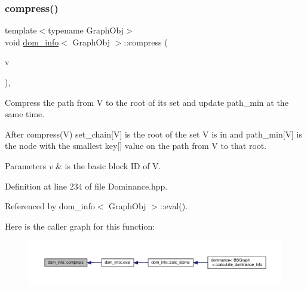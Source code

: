 \subsubsection{\texorpdfstring{compress()}{compress()}}
{\footnotesize\ttfamily template$<$typename Graph\+Obj$>$ \\
void \hyperlink{classdom__info}{dom\+\_\+info}$<$ Graph\+Obj $>$\+::compress (\begin{DoxyParamCaption}\item[{\hyperlink{Dominance_8hpp_ac35ffd4ddeccae8225d6ec6f55d65a97}{T\+BB}}]{v }\end{DoxyParamCaption})\hspace{0.3cm}{\ttfamily [inline]}, {\ttfamily [private]}}



Compress the path from V to the root of its set and update path\+\_\+min at the same time. 

After compress(\+V) set\+\_\+chain\mbox{[}V\mbox{]} is the root of the set V is in and path\+\_\+min\mbox{[}V\mbox{]} is the node with the smallest key\mbox{[}\mbox{]} value on the path from V to that root. 
\begin{DoxyParams}{Parameters}
{\em v} & is the basic block ID of V. \\
\hline
\end{DoxyParams}


Definition at line 234 of file Dominance.\+hpp.



Referenced by dom\+\_\+info$<$ Graph\+Obj $>$\+::eval().

Here is the caller graph for this function\+:
\nopagebreak
\begin{figure}[H]
\begin{center}
\leavevmode
\includegraphics[width=350pt]{d3/dea/classdom__info_ab71b2fc1d5013a6deae14d348e4e74a6_icgraph}
\end{center}
\end{figure}
\mbox{\label{classdom__info_ab777c47542a377b76521d81f4fe89b7f}} 
